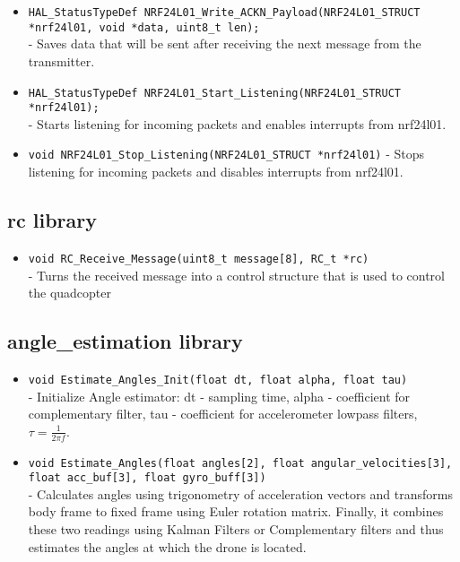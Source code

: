 {\begin{itemize}
    \item \texttt{HAL\_StatusTypeDef NRF24L01\_Write\_ACKN\_Payload(NRF24L01\_STRUCT \\
    *nrf24l01, void *data, uint8\_t len);}\\
    - Saves data that will be sent after receiving the next message from the transmitter.

    \item  \texttt{HAL\_StatusTypeDef NRF24L01\_Start\_Listening(NRF24L01\_STRUCT *nrf24l01);} \\
    - Starts listening for incoming packets and enables interrupts from nrf24l01.

    \item  \texttt{void NRF24L01\_Stop\_Listening(NRF24L01\_STRUCT *nrf24l01)}
    - Stops listening for incoming packets and disables interrupts from nrf24l01.
\end{itemize} 
\subsection{rc library}
\begin{itemize}
    \item \texttt{void RC\_Receive\_Message(uint8\_t message[8], RC\_t *rc)} \\
    - Turns the received message into a control structure that is used to control the quadcopter
\end{itemize}
\subsection{angle\_estimation library}
    \begin{itemize}
    \item \texttt{void Estimate\_Angles\_Init(float dt, float alpha, float tau)}\\
    - Initialize Angle estimator: dt - sampling time, alpha - coefficient for complementary filter, tau - coefficient for accelerometer low\-pass filters, $\tau = \frac{1}{2 \pi f}$.
    \item  \texttt{void Estimate\_Angles(float angles[2], float angular\_velocities[3], \\
    float acc\_buf[3], float gyro\_buff[3])} \\
    - Calculates angles using trigonometry of acceleration vectors and transforms body frame to fixed frame using Euler rotation matrix. Finally, it combines these two readings using Kalman Filters or Complementary filters and thus estimates the angles at which the drone is located.
    \end{itemize}
}
